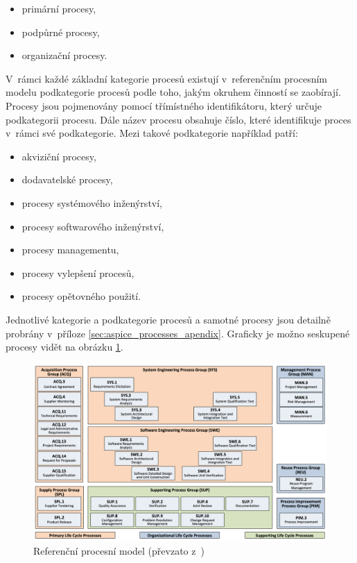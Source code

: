 \documentclass[czech,master]{diploma}
\begin{document}
\begin{itemize}
\item primární procesy,
\item podpůrné procesy,
\item organizační procesy.
\end{itemize}

V~rámci každé základní kategorie procesů existují v~referenčním procesním modelu podkategorie procesů podle toho, jakým okruhem činností se zaobírají. Procesy jsou pojmenovány pomocí třímístného identifikátoru, který určuje podkategorii procesu. Dále název procesu obsahuje číslo, které identifikuje proces v~rámci své podkategorie. Mezi takové podkategorie například patří:

\begin{itemize}
\item akviziční procesy,
\item dodavatelské procesy,
\item procesy systémového inženýrství,
\item procesy softwarového inženýrství,
\item procesy managementu,
\item procesy vylepšení procesů,
\item procesy opětovného použití.
\end{itemize}

Jednotlivé kategorie a podkategorie procesů a samotné procesy jsou detailně probrány v~příloze \ref{sec:aspice_processes_apendix}. Graficky je možno seskupené procesy vidět na obrázku \ref{fig:prm}.
\begin{figure}[!ht]
    \centering
    \includegraphics[width=1\textwidth]{Diplomka/Figures/prm.png}
    \caption{Referenční procesní model (převzato z~\cite{ref:aspice_download_prm})}
    \label{fig:prm}
\end{figure}
\end{document}
